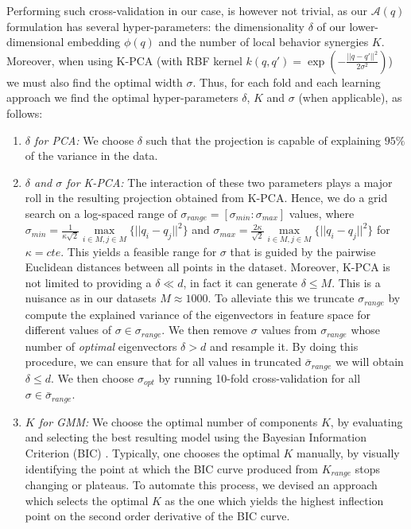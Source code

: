 \documentclass[letterpaper, 10 pt, conference,fleqn]{ieeeconf}
\begin{document}
Performing such cross-validation in our case, is however not trivial, as our $\mathcal{A}(q)$ formulation has several hyper-parameters: the dimensionality $\delta$ of our lower-dimensional embedding $\phi(q)$ and the number of local behavior synergies $K$. Moreover, when using K-PCA (with RBF kernel $k(q,q') = \exp(-\frac{||q-q'||^2}{2\sigma^2})$) we must also find the optimal width $\sigma$. Thus, for each fold and each learning approach we find the optimal hyper-parameters $\delta$, $K$ and $\sigma$ (when applicable), as follows:
\begin{enumerate}[leftmargin=*]
\item \textit{$\delta$ for PCA:} We choose $\delta$ such that the projection is capable of explaining $95\%$ of the variance in the data.
\item \textit{$\delta$ and $\sigma$ for K-PCA:} The interaction of these two parameters plays a major roll in the resulting projection obtained from K-PCA. Hence, we do a grid search on a log-spaced range of $\sigma_{range} = [\sigma_{min}:\sigma_{max}]$ values, where 
$\sigma_{min} = \frac{1}{\kappa\sqrt{2}} \underset{i \in M,j\in M}{\max}\{||q_i - q_j||^2\}$ and $\sigma_{max} = \frac{2\kappa}{\sqrt{2}} \underset{i \in M,j\in M}{\max}\{||q_i - q_j||^2\}$ for $\kappa = cte.$ This yields a feasible range for $\sigma$ that is guided by the pairwise Euclidean distances between all points in the dataset. Moreover, K-PCA is not limited to providing a $\delta \ll d$, in fact it can generate $\delta \le M$. This is a nuisance as in our datasets $M\approx1000$. To alleviate this we truncate $\sigma_{range}$ by compute the explained variance of the eigenvectors in feature space for different values of  $\sigma \in \sigma_{range}$. We then remove $\sigma$ values from $\sigma_{range}$ whose number of \textit{optimal} eigenvectors $\delta > d$ and resample it. By doing this procedure, we can ensure that for all values in truncated $\bar{\sigma}_{range}$ we will obtain $\delta \le d$. We then choose $\sigma_{opt}$ by running 10-fold cross-validation for all $\sigma \in \bar{\sigma}_{range}$. 
\item \textit{$K$ for GMM:} We choose the optimal number of components $K$, by evaluating and selecting the best resulting model using the Bayesian Information Criterion (BIC) \cite{Bishop:PRM:2006}. Typically, one chooses the optimal $K$ manually, by visually identifying the point at which the BIC curve produced from $K_{range}$ stops changing or plateaus. To automate this process, we devised an approach which selects the optimal $K$ as the one which yields the highest inflection point on the second order derivative of the BIC curve.
\end{enumerate}
\end{document}
